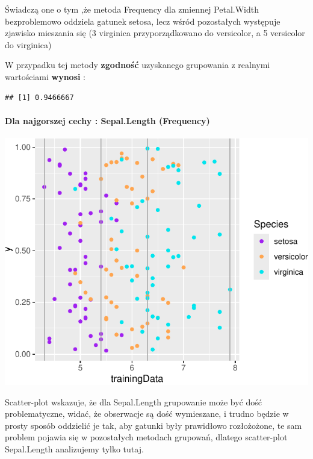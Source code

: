 \documentclass[
  12pt,
]{article}
\begin{document}
Świadczą one o tym ,że metoda Frequency dla zmiennej Petal.Width
bezproblemowo oddziela gatunek setosa, lecz wśród pozostałych występuje
zjawisko mieszania się (3 virginica przyporządkowano do versicolor, a 5
versicolor do virginica)

W przypadku tej metody \textbf{zgodność} uzyskanego grupowania z
realnymi wartościami \textbf{wynosi} :

\begin{verbatim}
## [1] 0.9466667
\end{verbatim}

\paragraph{Dla najgorszej cechy : Sepal.Length
(Frequency)}\label{dla-najgorszej-cechy-sepal.length-frequency}

\begin{center}\includegraphics{Sprawozdanie2_files/figure-latex/frequences_najg-1} \end{center}

Scatter-plot wskazuje, że dla Sepal.Length grupowanie może być dość
problematyczne, widać, że obserwacje są dość wymieszane, i trudno będzie
w prosty sposób oddzielić je tak, aby gatunki były prawidłowo
rozłożożone, te sam problem pojawia się w pozostałych metodach grupowań,
dlatego scatter-plot Sepal.Length analizujemy tylko tutaj.
\end{document}
